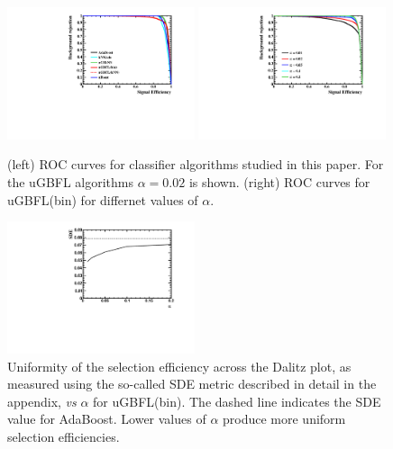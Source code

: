 \begin{figure}[] 
  \centering 
  \includegraphics[width=0.49\textwidth]{graphs2/ROC_DP.pdf}
  \includegraphics[width=0.49\textwidth]{graphs2/ROC_DP_Alpha.pdf}\\
  \caption{\label{fig:dalitz_rocs} (left) ROC curves for classifier algorithms studied in this paper.  For the uGBFL algorithms $\alpha=0.02$ is shown.  (right) ROC curves for uGBFL(bin) for differnet values of $\alpha$.}
\end{figure}

\begin{figure}[] 
  \centering 
  \includegraphics[width=0.49\textwidth]{graphs2/sde_v_alpha.pdf}
  \caption{\label{fig:dalitz_sde_v_alpha} Uniformity of the selection efficiency across the Dalitz plot, as measured using the so-called SDE metric described in detail in the appendix, {\em vs} $\alpha$ for uGBFL(bin).  The dashed line indicates the SDE value for AdaBoost.  Lower values of $\alpha$ produce more uniform selection efficiencies.}
\end{figure}

